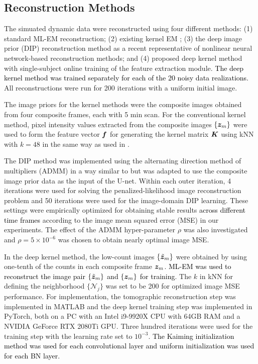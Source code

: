\documentclass[]{IEEETran}
\newcommand{\txtb}[1]{\textcolor{black}{#1}}
\begin{document}
	\subsection{Reconstruction Methods}
	
	The simuated dynamic data were reconstructed using four different methods: (1) standard ML-EM reconstruction; (2) existing kernel EM \cite{Wang2015}; (3) the  deep image prior (DIP) reconstruction method \cite{Gong2019} as a recent representative of nonlinear neural network-based reconstruction methods; and (4) proposed deep kernel method with single-subject online training of the feature extraction module. \txtb{The deep kernel method was trained separately for each of the 20 noisy data realizations.} All reconstructions were run for 200 iterations with a uniform initial image.
	
	The image priors for the kernel methods were the composite images obtained from four composite frames, each with 5 min scan. For the conventional kernel method, pixel intensity values extracted from the composite images {\txtb{$\{\bm{z}_m\}$}} were used to form the feature vector $\bm{f}$ for generating the kernel matrix $\bm{K}$ using kNN with $k=48$ in the same way as used in \cite{Wang2015}. 
	
	The DIP method was implemented using the alternating direction method of multipliers (ADMM) in a way similar to \cite{Gong2019} but was adapted to use the composite image prior data as the input of the U-net. Within each outer iteration, 4 iterations were used for solving the penalized-likelihood image reconstruction problem and 50 iterations were used for the image-domain DIP learning. These settings were empirically optimized for obtaining stable results \txtb{across different time frames} according to the image mean squared error (MSE)  in our experiments. The effect of the ADMM hyper-parameter $\rho$ was also investigated and $ \rho= 5\times10^{-6}$ was chosen to obtain nearly optimal image MSE.
	
	In the deep kernel method, the low-count images $\{\tilde{\bm{z}}_m\}$ were obtained by using one-tenth of the counts in each composite frame $\bm{z}_m$. \txtb{ML-EM was used to reconstruct the image pair $\{\tilde{\bm{z}}_m\}$ and $\{\bm{z}_m\}$ for training}. The $k$ in kNN for defining the neighborhood $\{\mathcal{N}_j\}$ was set to be 200 for optimized image MSE performance. For implementation, the tomographic reconstruction step was implemented in MATLAB and the deep kernel training step was implemented in PyTorch, both on a PC with an Intel i9-9920X CPU with 64GB RAM and a NVIDIA GeForce RTX 2080Ti GPU. Three hundred iterations were used for the training step with the learning rate set to $10^{-3}$. \txtb{The Kaiming initialization method\cite{He2015} was used for each convolutional layer and uniform initialization was used for each BN layer.}
	
\end{document}

